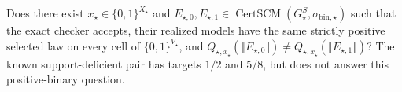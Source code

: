 Does there exist \(x_\star\in\{0,1\}^{X_\star}\) and \(E_{\star,0},E_{\star,1}\in\operatorname{CertSCM}(G_\star^S,\sigma_{\mathrm{bin},\star})\) such that the exact checker accepts, their realized models have the same strictly positive selected law on every cell of \(\{0,1\}^{V_\star}\), and \(Q_{\star,x_\star}(\llbracket E_{\star,0}\rrbracket)\ne Q_{\star,x_\star}(\llbracket E_{\star,1}\rrbracket)\)? The known support-deficient pair has targets \(1/2\) and \(5/8\), but does not answer this positive-binary question.